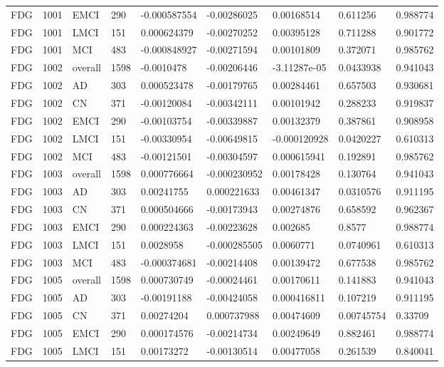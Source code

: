 \begin{landscape}
\begin{longtable}{lllllllll}
FDG & 1001 & EMCI & 290 & -0.000587554 & -0.00286025 & 0.00168514 & 0.611256 & 0.988774 \\
FDG & 1001 & LMCI & 151 & 0.000624379 & -0.00270252 & 0.00395128 & 0.711288 & 0.901772 \\
FDG & 1001 & MCI & 483 & -0.000848927 & -0.00271594 & 0.00101809 & 0.372071 & 0.985762 \\
FDG & 1002 & overall & 1598 & -0.0010478 & -0.00206446 & -3.11287e-05 & 0.0433938 & 0.941043 \\
FDG & 1002 & AD & 303 & 0.000523478 & -0.00179765 & 0.00284461 & 0.657503 & 0.930681 \\
FDG & 1002 & CN & 371 & -0.00120084 & -0.00342111 & 0.00101942 & 0.288233 & 0.919837 \\
FDG & 1002 & EMCI & 290 & -0.00103754 & -0.00339887 & 0.00132379 & 0.387861 & 0.908958 \\
FDG & 1002 & LMCI & 151 & -0.00330954 & -0.00649815 & -0.000120928 & 0.0420227 & 0.610313 \\
FDG & 1002 & MCI & 483 & -0.00121501 & -0.00304597 & 0.000615941 & 0.192891 & 0.985762 \\
FDG & 1003 & overall & 1598 & 0.000776664 & -0.000230952 & 0.00178428 & 0.130764 & 0.941043 \\
FDG & 1003 & AD & 303 & 0.00241755 & 0.000221633 & 0.00461347 & 0.0310576 & 0.911195 \\
FDG & 1003 & CN & 371 & 0.000504666 & -0.00173943 & 0.00274876 & 0.658592 & 0.962367 \\
FDG & 1003 & EMCI & 290 & 0.000224363 & -0.00223628 & 0.002685 & 0.8577 & 0.988774 \\
FDG & 1003 & LMCI & 151 & 0.0028958 & -0.000285505 & 0.0060771 & 0.0740961 & 0.610313 \\
FDG & 1003 & MCI & 483 & -0.000374681 & -0.00214408 & 0.00139472 & 0.677538 & 0.985762 \\
FDG & 1005 & overall & 1598 & 0.000730749 & -0.00024461 & 0.00170611 & 0.141883 & 0.941043 \\
FDG & 1005 & AD & 303 & -0.00191188 & -0.00424058 & 0.000416811 & 0.107219 & 0.911195 \\
FDG & 1005 & CN & 371 & 0.00274204 & 0.000737988 & 0.00474609 & 0.00745754 & 0.33709 \\
FDG & 1005 & EMCI & 290 & 0.000174576 & -0.00214734 & 0.00249649 & 0.882461 & 0.988774 \\
FDG & 1005 & LMCI & 151 & 0.00173272 & -0.00130514 & 0.00477058 & 0.261539 & 0.840041 \\

\end{longtable}
\end{landscape}
